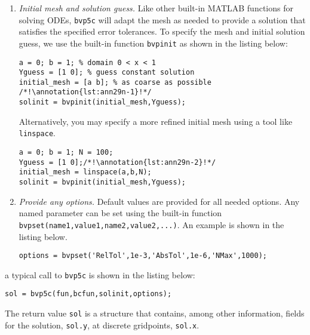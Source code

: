 \begin{enumerate}
\item \emph{Initial mesh and solution guess.} Like other built-in MATLAB functions for solving ODEs, \lstinline[style=myMatlab]{bvp5c} will adapt the mesh as needed to provide a solution that satisfies the specified error tolerances. To specify the mesh and initial solution guess, we use the built-in function \lstinline[style=myMatlab]{bvpinit} as shown in the listing below:
\begin{lstlisting}[style=myMatlab]
a = 0; b = 1; % domain 0 < x < 1
Yguess = [1 0]; % guess constant solution
initial_mesh = [a b]; % as coarse as possible /*!\annotation{lst:ann29n-1}!*/
solinit = bvpinit(initial_mesh,Yguess);
\end{lstlisting}
Alternatively, you may specify a more refined initial mesh using a tool like \lstinline[style=myMatlab]{linspace}. 
\begin{lstlisting}[style=myMatlab]
a = 0; b = 1; N = 100;
Yguess = [1 0];/*!\annotation{lst:ann29n-2}!*/
initial_mesh = linspace(a,b,N);
solinit = bvpinit(initial_mesh,Yguess);
\end{lstlisting}

\item \emph{Provide any options.}  Default values are provided for all needed options.  Any named parameter can be set using the built-in function \lstinline[style=myMatlab]{bvpset(name1,value1,name2,value2,...)}.  An example is shown in the listing below.
\begin{lstlisting}[style=myMatlab]
options = bvpset('RelTol',1e-3,'AbsTol',1e-6,'NMax',1000);
\end{lstlisting} 

\end{enumerate}

 a typical call to \lstinline[style=myMatlab]{bvp5c} is shown in the listing below:
\begin{lstlisting}[style=myMatlab]
sol = bvp5c(fun,bcfun,solinit,options);
\end{lstlisting}
The return value \lstinline[style=myMatlab]{sol} is a structure that contains, among other information, fields for the solution, \lstinline[style=myMatlab]{sol.y}, at discrete gridpoints, \lstinline[style=myMatlab]{sol.x}.

